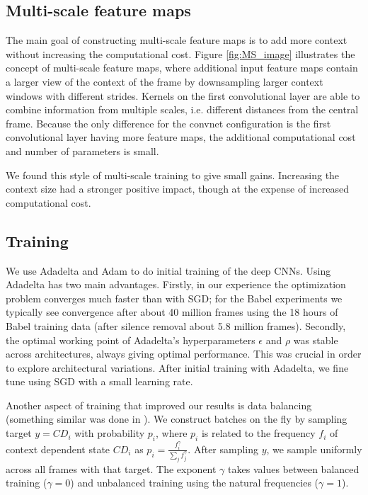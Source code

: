 \documentclass{article}
\begin{document}
\subsection{Multi-scale feature maps}
The main goal of constructing multi-scale feature maps is to add more context 
without increasing the computational cost.
Figure \ref{fig:MS_image} illustrates the concept of multi-scale feature maps,
where additional input feature maps contain a larger view of the context of the frame
by downsampling larger context windows with different strides.
Kernels on the first convolutional layer are able to combine information from
multiple scales, i.e. different distances from the central frame.
Because the only difference for the convnet configuration is the first convolutional
layer having more feature maps, the additional computational cost
and number of parameters is small.

We found this style of multi-scale training to give small gains. 
Increasing the context size had a stronger positive impact, though
at the expense of increased computational cost.

\subsection{Training}
\label{ssec:training}


We use Adadelta \cite{zeiler2012adadelta} and Adam \cite{kingma2014adam} to do initial training
of the deep CNNs. Using Adadelta has two main advantages. Firstly, in our experience the optimization
problem converges much faster than with SGD; for the Babel experiments
we typically see convergence after about 40 million frames
using the 18 hours of Babel training data (after silence removal about 5.8 million frames).
Secondly, the optimal working point of Adadelta's hyperparameters $\epsilon$ and $\rho$ 
was stable across architectures, always giving optimal performance. This was crucial in order to 
explore architectural variations.
After initial training with Adadelta, we fine tune using SGD with a small learning rate.

Another aspect of training that improved our results is data balancing (something similar 
was done in \cite{sermanet2013overfeat}). We construct batches on the fly
by sampling target $y=CD_i$ with probability $p_i$, where $p_i$ is related to the frequency $f_i$ of
context dependent state $CD_i$ as $p_i = \frac{f_i^\gamma}{\sum_j f_j^\gamma}$.
After sampling $y$, we sample uniformly across all frames with that target.
The exponent $\gamma$ takes values between balanced training ($\gamma=0$) and
unbalanced training using the natural frequencies ($\gamma=1$).
\end{document}
